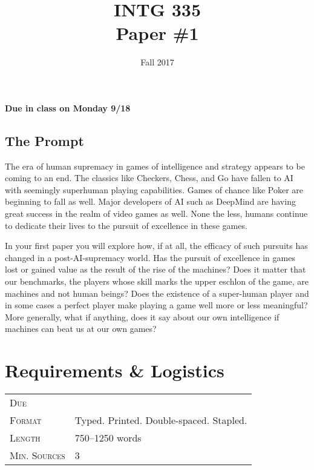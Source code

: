 \documentclass[nobib]{tufte-handout}
\title{INTG 335 \\ Paper \#1 }
\date{ Fall 2017 }
\begin{document}
\maketitle
\thispagestyle{empty}

\begin{center}
  \textbf{Due in class on Monday 9/18}
\end{center}

\subsection*{The Prompt}

The era of human supremacy in games of intelligence and strategy appears to be coming to an end. The classics like Checkers, Chess, and Go have fallen to AI with seemingly superhuman playing capabilities. Games of chance like Poker are beginning to fall as well. Major developers of AI such as DeepMind are having great success in the realm of video games as well. None the less, humans continue to dedicate their lives to the pursuit of excellence in these games.

In your first paper you will explore how, if at all, the efficacy of such pursuits has changed in a post-AI-supremacy world. Has the pursuit of excellence in games lost or gained value as the result of the rise of the machines? Does it matter that our benchmarks, the players whose skill marks the upper eschlon of the game, are machines and not human beings?  Does the existence of a super-human player and in some cases a perfect player make playing a game well more or less meaningful? More generally, what if anything, does it say about our own intelligence if machines can beat us at our own games?

\section{Requirements \& Logistics}

\begin{tabular}{ll}
\textsc{Due} &  \\
\textsc{Format} & Typed. Printed. Double-spaced. Stapled. \\
\textsc{Length} & 750--1250 words \\
\textsc{Min. Sources} & 3
\end{tabular}
\vspace{.25in}
\end{document}
